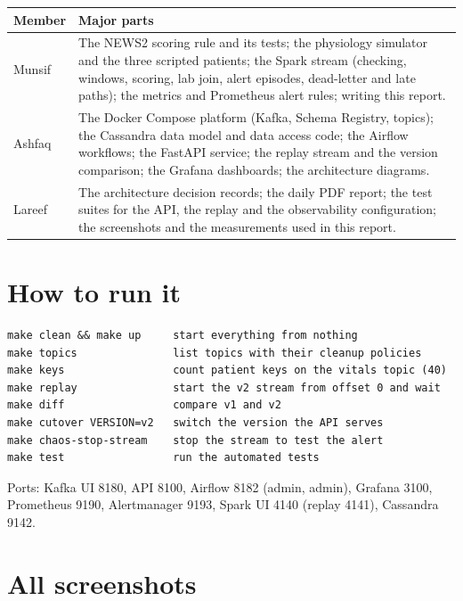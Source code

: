 \documentclass[11pt,a4paper]{article}
\newcommand{\authorA}{Munsif}
\newcommand{\authorB}{Ashfaq}
\newcommand{\authorC}{Lareef}
\begin{document}
\begin{table}[H]\centering\small
\begin{tabularx}{\linewidth}{|l|X|}
\hline
\rowcolor{tablehead}\textbf{Member} & \textbf{Major parts} \\ \hline
\authorA & The NEWS2 scoring rule and its tests; the physiology simulator and the three
scripted patients; the Spark stream (checking, windows, scoring, lab join, alert
episodes, dead-letter and late paths); the metrics and Prometheus alert rules; writing
this report. \\ \hline
\authorB & The Docker Compose platform (Kafka, Schema Registry, topics); the Cassandra
data model and data access code; the Airflow workflows; the FastAPI service; the replay
stream and the version comparison; the Grafana dashboards; the architecture diagrams. \\ \hline
\authorC & The architecture decision records; the daily PDF report; the test suites for
the API, the replay and the observability configuration; the screenshots and the
measurements used in this report. \\ \hline
\end{tabularx}
\end{table}

\section{How to run it}

\begin{verbatim}
make clean && make up     start everything from nothing
make topics               list topics with their cleanup policies
make keys                 count patient keys on the vitals topic (40)
make replay               start the v2 stream from offset 0 and wait
make diff                 compare v1 and v2
make cutover VERSION=v2   switch the version the API serves
make chaos-stop-stream    stop the stream to test the alert
make test                 run the automated tests
\end{verbatim}

Ports: Kafka UI 8180, API 8100, Airflow 8182 (admin, admin), Grafana 3100, Prometheus
9190, Alertmanager 9193, Spark UI 4140 (replay 4141), Cassandra 9142.

\section{All screenshots}\label{app:shots}
\end{document}
